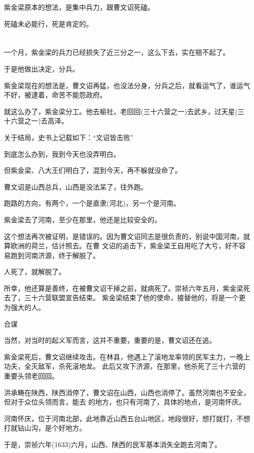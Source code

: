 \documentclass[11pt,a4paper,onecolumn]{article}
\begin{document}
紫金梁原本的想法，是集中兵力，跟曹文诏死磕。

死磕未必能行，死是肯定的。

\section[\thesection]{}

一个月，紫金梁的兵力已经损失了近三分之一，这么下去，实在赔不起了。

于是他做出决定，分兵。

紫金梁现在的想法是，曹文诏再猛，也没法分身，分兵之后，就看运气了，谁运气不好，被逮着，命苦不能怨政府。

就这么办了，紫金梁分工。他去榆社，老回回(三十六营之一)去武乡，过天星(三十六营之一)去高泽。

关于结局，史书上记载如下：``文诏皆击败''

到底怎么办到，我到今天也没弄明白。

但紫金梁、八大王们明白了，混到今天，再不躲就没命了。

曹文诏是山西总兵，山西是没法呆了，往外跑。

跑路的方向，有两个，一个是直隶(河北)，另一个是河南。

紫金梁去了河南，至少在那里，他还是比较安全的。

这个想法再次被证明，是错误的。因为曹文诏同志是很负责的，别说中国河南，就算欧洲的荷兰，估计照去。在曹
文诏的追击下，紫金梁王自用吃了大亏，好不容易跑到河南济源，终于解脱了。

人死了，就解脱了。

所幸，他还算是善终，在被曹文诏干掉之前，就病死了。崇祯六年五月，紫金梁死去了，三十六营联盟宣告结束。
紫金梁结束了他的使命，接替他的，将是一个更为强大的人。

合谋

当然，对当时的起义军而言，这并不重要，重要的是，曹文诏还在追。

紫金梁死后，曹文诏继续攻击。在林县，他遇上了滚地龙率领的民军主力，一晚上功夫，全灭敌军，杀死滚地龙。
此后又攻下济源，在那里，他杀死了三十六营的重要头领老回回。

洪承畴在陕西，陕西消停了，曹文诏在山西，山西也消停了。虽然河南也不安全，但对于众位头领而言，能去
的地方，也只有河南了，具体的地点，是河南怀庆。

河南怀庆，位于河南北部，此地靠近山西五台山地区，地段很好，想打就打，不想打就钻山沟，是个好地方。

于是，崇祯六年(1633)六月，山西、陕西的民军基本消失\myrule 全跑去河南了。
\end{document}
